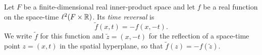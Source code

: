 \begin{definition}
Let $F$ be a finite-dimensional real inner-product space and let $f$ be a real
function on the space-time $\ell^2(F\times\mathbb{R})$. Its \emph{time reversal} is
\[
  \widetilde f(x,t)=-f(x,-t).
\]
We write $\widetilde f$ for this function and $\widetilde z=(x,-t)$ for the
reflection of a space-time point $z=(x,t)$ in the spatial hyperplane, so that
$\widetilde f(z)=-f(\widetilde z)$.
\end{definition}

